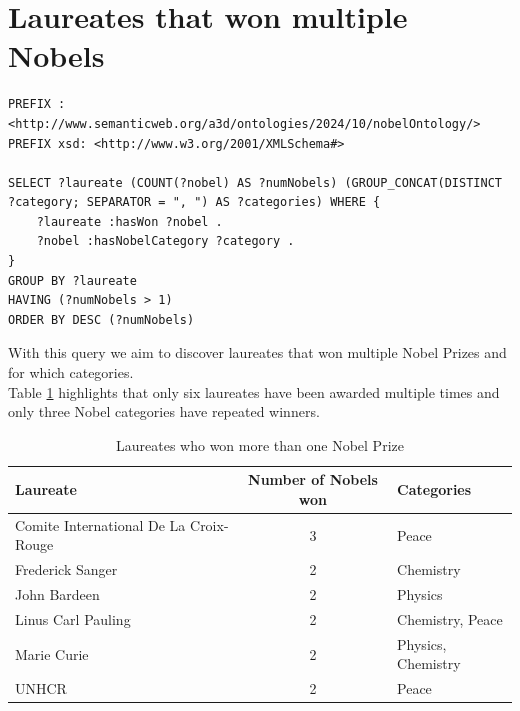 \documentclass{article}
\begin{document}
\newpage

\section{Laureates that won multiple Nobels}

\begin{lstlisting}
PREFIX : <http://www.semanticweb.org/a3d/ontologies/2024/10/nobelOntology/>
PREFIX xsd: <http://www.w3.org/2001/XMLSchema#>

SELECT ?laureate (COUNT(?nobel) AS ?numNobels) (GROUP_CONCAT(DISTINCT ?category; SEPARATOR = ", ") AS ?categories) WHERE {
    ?laureate :hasWon ?nobel .
    ?nobel :hasNobelCategory ?category .
}
GROUP BY ?laureate
HAVING (?numNobels > 1)
ORDER BY DESC (?numNobels)
\end{lstlisting}

\vspace{1em}

With this query we aim to discover laureates that won multiple Nobel Prizes and for which categories.\\
Table \ref{tab:moreThanOneNobel} highlights that only six laureates have been awarded multiple times and only three
Nobel categories have repeated winners.

\begin{table}[H]
	\centering
	\begin{tabular}{|l|c|l|}
		\hline
		\textbf{Laureate}                      & \textbf{Number of Nobels won} & \textbf{Categories} \\ \hline
		Comite International De La Croix-Rouge & 3                             & Peace               \\ \hline
		Frederick Sanger                       & 2                             & Chemistry           \\ \hline
		John Bardeen                           & 2                             & Physics             \\ \hline
		Linus Carl Pauling                     & 2                             & Chemistry, Peace    \\ \hline
		Marie Curie                            & 2                             & Physics, Chemistry  \\ \hline
		UNHCR                                  & 2                             & Peace               \\ \hline
	\end{tabular}
	\caption{Laureates who won more than one Nobel Prize}
	\label{tab:moreThanOneNobel}
\end{table}
\end{document}
